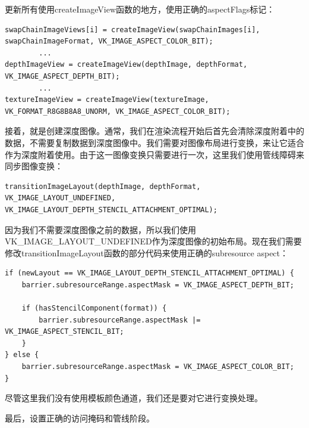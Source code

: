 \documentclass{ctexart}
\begin{document}
更新所有使用createImageView函数的地方，使用正确的aspectFlags标记：

\begin{lstlisting}[language={[ANSI]C}]
swapChainImageViews[i] = createImageView(swapChainImages[i],
swapChainImageFormat, VK_IMAGE_ASPECT_COLOR_BIT);
		...
depthImageView = createImageView(depthImage, depthFormat, VK_IMAGE_ASPECT_DEPTH_BIT);
		...
textureImageView = createImageView(textureImage, VK_FORMAT_R8G8B8A8_UNORM, VK_IMAGE_ASPECT_COLOR_BIT);
\end{lstlisting}

接着，就是创建深度图像。通常，我们在渲染流程开始后首先会清除深度附着中的数据，不需要复制数据到深度图像中。我们需要对图像布局进行变换，来让它适合作为深度附着使用。由于这一图像变换只需要进行一次，这里我们使用管线障碍来同步图像变换：

\begin{lstlisting}[language={[ANSI]C}]
transitionImageLayout(depthImage, depthFormat, VK_IMAGE_LAYOUT_UNDEFINED, VK_IMAGE_LAYOUT_DEPTH_STENCIL_ATTACHMENT_OPTIMAL);
\end{lstlisting}

因为我们不需要深度图像之前的数据，所以我们使用VK\_IMAGE\_LAYOUT\_UNDEFINED作为深度图像的初始布局。现在我们需要修改transitionImageLayout函数的部分代码来使用正确的subresource aspect：

\begin{lstlisting}[language={[ANSI]C}]
if (newLayout == VK_IMAGE_LAYOUT_DEPTH_STENCIL_ATTACHMENT_OPTIMAL) {
	barrier.subresourceRange.aspectMask = VK_IMAGE_ASPECT_DEPTH_BIT;

	if (hasStencilComponent(format)) {
		barrier.subresourceRange.aspectMask |= VK_IMAGE_ASPECT_STENCIL_BIT;
	}
} else {
	barrier.subresourceRange.aspectMask = VK_IMAGE_ASPECT_COLOR_BIT;
}
\end{lstlisting}

尽管这里我们没有使用模板颜色通道，我们还是要对它进行变换处理。

最后，设置正确的访问掩码和管线阶段。
\end{document}
